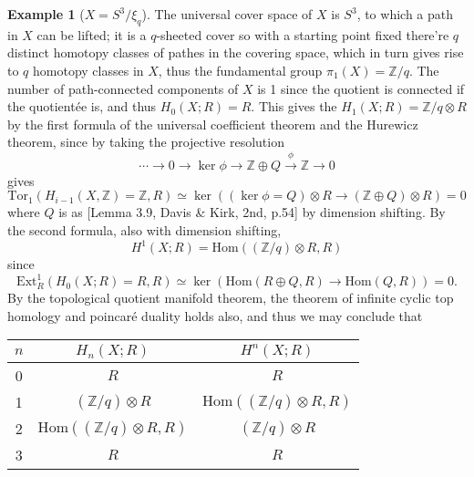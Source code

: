\documentclass[10pt]{report}
\theoremstyle{definition}
\newtheorem{example}{Example}
\begin{document}
\begin{example}[$X={S^3}\big/{\xi_q}$]
The universal cover space of $X$ is $S^3$, to which a path in $X$ can be lifted; it is a $q$-sheeted cover so with a starting point fixed there're $q$ distinct homotopy classes of pathes in the covering space, which in turn gives rise to $q$ homotopy classes in $X$, thus the fundamental group $\pi_1(X)=\mathbb{Z}/q$. The number of path-connected components of $X$ is 1 since the quotient is connected if the quotient\'ee is, and thus $H_0(X;R)=R$. This gives the $H_1(X;R)=\mathbb{Z}/q\otimes R$ by the first formula of the universal coefficient theorem and the Hurewicz theorem, since by taking the projective resolution $$\cdots\to0\to\ker\phi\to\mathbb{Z}\oplus Q\overset{\phi}{\to}\mathbb{Z}\to 0$$ gives $$\mathrm{Tor}_1(H_{i-1}(X,\mathbb{Z})=\mathbb{Z},R)\simeq\ker((\ker\phi=Q)\otimes R\to(\mathbb{Z}\oplus Q)\otimes R)=0$$ where $Q$ is as [Lemma 3.9, Davis \& Kirk, 2nd, p.54] by dimension shifting. By the second formula, also with dimension shifting, $$H^1(X;R)=\mathrm{Hom}((\mathbb{Z}/q)\otimes R,R)$$ since $$\mathrm{Ext}_R^1(H_{0}(X;R)=R,R)\simeq\ker(\mathrm{Hom}(R\oplus Q,R)\to\mathrm{Hom}(Q,R))=0.$$ By the topological quotient manifold theorem, the theorem of infinite cyclic top homology and poincar\'e duality holds also, and thus we may conclude that
\begin{center}
\begin{tabular}{|c|c|c|}
  \hline
  $n$ & $H_n(X;R)$ & $H^n(X;R)$ \\
  \hline
  0 & $R$ & $R$ \\
  \hline
  1 & $(\mathbb{Z}/q)\otimes R$ & $\mathrm{Hom}((\mathbb{Z}/q)\otimes R,R)$ \\
  \hline
  2 & $\mathrm{Hom}((\mathbb{Z}/q)\otimes R,R)$ & $(\mathbb{Z}/q)\otimes R$ \\
  \hline
  3 & $R$ & $R$ \\
  \hline
\end{tabular}
\end{center}
\end{example}
\end{document}
